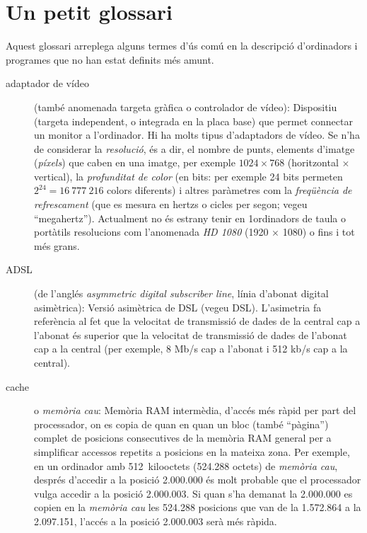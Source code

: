 \section{Un petit glossari}
\label{ss:OiPgloss}

Aquest glossari arreplega alguns termes d'ús comú en la descripció
d'ordinadors i programes que no han estat definits més amunt.


\begin{description}
\item[adaptador de vídeo] (també anomenada targeta gràfica o
  controlador de vídeo): Dispositiu (targeta independent, o integrada
  en la placa base) que permet connectar un monitor a l'ordinador. Hi
  ha molts tipus d'adaptadors de vídeo. Se n'ha de considerar la
  \emph{resolució}, és a dir, el nombre de punts, elements d'imatge
  (\emph{píxels}) que caben en una imatge, per exemple $1024 \times
  768$ (horitzontal $\times$ vertical), la \emph{profunditat de color}
  (en bits: per exemple 24 bits permeten $2^{24}=16~777~216$ colors
  diferents) i altres paràmetres com la {\em freqüència de
    refrescament} (que es mesura en hertzs o cicles per segon; vegeu
  ``megahertz''). Actualment no és estrany tenir en 1ordinadors de
  taula o portàtils resolucions com l'anomenada \emph{HD 1080} (1920
  $\times$ 1080) o fins i tot més grans.
  
\item[ADSL] (de l'anglés \emph{asymmetric digital subscriber line},
  línia d'abonat digital asimètrica): Versió asimètrica de DSL (vegeu
  DSL). L'asimetria fa referència al fet que la velocitat de
  transmissió de dades de la central cap a l'abonat és superior que la
  velocitat de transmissió de dades de l'abonat cap a la central (per
  exemple, 8 Mb/s cap a l'abonat i 512 kb/s cap a la central).

\item[cache] o \emph{memòria cau}: Memòria RAM intermèdia, d'accés més
  ràpid per part del processador, on es copia de quan en quan un bloc
  (també ``pàgina'') complet de posicions consecutives de la memòria
  RAM general per a simplificar accessos repetits a posicions en la
  mateixa zona. Per exemple, en un ordinador amb 512~kilooctets
  (524.288 octets) de \emph{memòria cau}, després d'accedir a la
  posició 2.000.000 és molt probable que el processador vulga accedir
  a la posició 2.000.003. Si quan s'ha demanat la 2.000.000 es copien
  en la \emph{memòria cau} les 524.288 posicions que van de la
  1.572.864 a la 2.097.151, l'accés a la posició 2.000.003 serà més
  ràpida.


\end{description}
